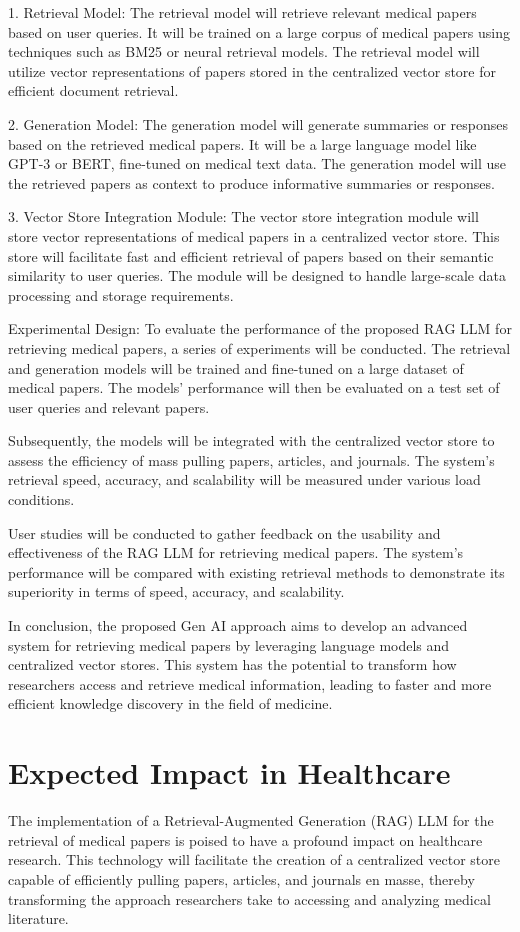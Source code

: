 \documentclass{article}
\begin{document}
1. Retrieval Model:
The retrieval model will retrieve relevant medical papers based on user queries. It will be trained on a large corpus of medical papers using techniques such as BM25 or neural retrieval models. The retrieval model will utilize vector representations of papers stored in the centralized vector store for efficient document retrieval.

2. Generation Model:
The generation model will generate summaries or responses based on the retrieved medical papers. It will be a large language model like GPT-3 or BERT, fine-tuned on medical text data. The generation model will use the retrieved papers as context to produce informative summaries or responses.

3. Vector Store Integration Module:
The vector store integration module will store vector representations of medical papers in a centralized vector store. This store will facilitate fast and efficient retrieval of papers based on their semantic similarity to user queries. The module will be designed to handle large-scale data processing and storage requirements.

Experimental Design:
To evaluate the performance of the proposed RAG LLM for retrieving medical papers, a series of experiments will be conducted. The retrieval and generation models will be trained and fine-tuned on a large dataset of medical papers. The models' performance will then be evaluated on a test set of user queries and relevant papers.

Subsequently, the models will be integrated with the centralized vector store to assess the efficiency of mass pulling papers, articles, and journals. The system's retrieval speed, accuracy, and scalability will be measured under various load conditions.

User studies will be conducted to gather feedback on the usability and effectiveness of the RAG LLM for retrieving medical papers. The system's performance will be compared with existing retrieval methods to demonstrate its superiority in terms of speed, accuracy, and scalability.

In conclusion, the proposed Gen AI approach aims to develop an advanced system for retrieving medical papers by leveraging language models and centralized vector stores. This system has the potential to transform how researchers access and retrieve medical information, leading to faster and more efficient knowledge discovery in the field of medicine.

\section*{Expected Impact in Healthcare}
The implementation of a Retrieval-Augmented Generation (RAG) LLM for the retrieval of medical papers is poised to have a profound impact on healthcare research. This technology will facilitate the creation of a centralized vector store capable of efficiently pulling papers, articles, and journals en masse, thereby transforming the approach researchers take to accessing and analyzing medical literature.
\end{document}
